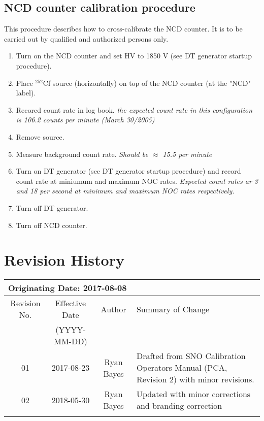 \subsection{ NCD counter calibration procedure}

This procedure describes how to cross-calibrate the NCD counter. It is to be carried out by qualified and authorized persons only.
\begin{enumerate}
\item \CheckBox[name=ncdcc1]{} Turn on the NCD counter and set HV to 1850 V (see DT generator startup procedure).
\item \CheckBox[name=ncdcc2]{} Place $^{252}$Cf source (horizontally) on top of the NCD counter (at the "NCD" label).
\item \CheckBox[name=ncdcc3]{} Recored count rate in log book. {\it the expected count rate in this configuration is 106.2 counts per minute (March 30/2005)}
\item \CheckBox[name=ncdcc4]{} Remove source.
\item \CheckBox[name=ncdcc5]{} Measure background count rate.  {\it Should be $\approx$ 15.5 per minute}
\item \CheckBox[name=ncdcc6]{} Turn on DT generator (see DT generator startup procedure) and record count rate at miniumum and maximum NOC rates. {\it Expected count rates ar 3 and 18 per second at minimum and maximum NOC rates respectively.}
\item \CheckBox[name=ncdcc7]{} Turn off DT generator.
\item \CheckBox[name=ncdcc8]{} Turn off NCD counter.
\end{enumerate}

\section{Revision History}
\begin{tabular}{|c|c|c|p{6cm}|}
\hline\hline
\multicolumn{4}{|l|}{Originating Date: 2017-08-08}\\
\hline
Revision No. & Effective Date & Author & Summary of Change \\
& (YYYY-MM-DD) & & \\
\hline
01 & 2017-08-23 & Ryan Bayes & Drafted from SNO Calibration Operators Manual (PCA, Revision 2) with minor revisions.\\
\hline
02 & 2018-05-30 & Ryan Bayes & Updated with minor corrections and
branding correction\\
\hline
& & & \\
\hline \hline

\end{tabular}

